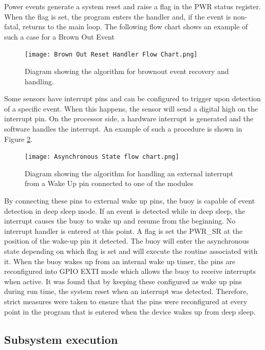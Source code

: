 Power events generate a system reset and raise a flag in the PWR status register. When the flag is set, the program enters the handler and, if the event is non-fatal, returns to the main loop. The following flow chart shows an example of such a case for a Brown Out Event

\begin{figure}[H]
	\centering
	\texttt{[image: Brown Out Reset Handler Flow Chart.png]}
	\caption{Diagram showing the algorithm for brownout event recovery and handling.}
	\label{fig:evt_handle}
\end{figure}

Some sensors have interrupt pins and can be configured to trigger upon detection of a specific event. When this happens, the sensor will send a digital high on the interrupt pin. On the processor side, a hardware interrupt is generated and the software handles the interrupt. An example of such a procedure is shown in Figure \ref{fig:int_handle}.

\begin{figure}[H]
	\centering
	\texttt{[image: Asynchronous State flow chart.png]}
	\caption{Diagram showing the algorithm for handling an external interrupt from a Wake Up pin connected to one of the modules}
	\label{fig:int_handle}
\end{figure}

By connecting these pins to external wake up pins, the buoy is capable of event detection in deep sleep mode. If an event is detected while in deep sleep, the interrupt causes the buoy to wake up and resume from the beginning. No interrupt handler is entered at this point. A flag is set the PWR\_SR at the position of the wake-up pin it detected. The buoy will enter the asynchronous state depending on which flag is set and will execute the routine associated with it.  When the buoy wakes up from an internal wake up timer, the pins are reconfigured into GPIO EXTI mode which allows the buoy to receive interrupts when active. It was found that by keeping these configured as wake up pins during run time, the system reset when an interrupt was detected. Therefore, strict measures were taken to ensure that the pins were reconfigured at every point in the program that is entered when the device wakes up from deep sleep.

\subsection{Subsystem execution}

